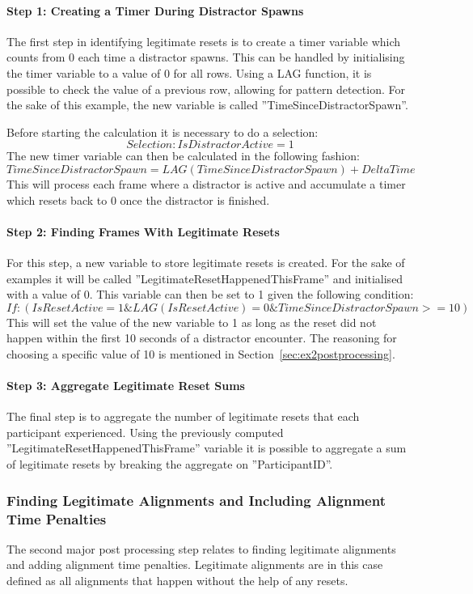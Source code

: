 \paragraph{Step 1: Creating a Timer During Distractor Spawns}
The first step in identifying legitimate resets is to create a timer variable which counts from 0 each time a distractor spawns. This can be handled by initialising the timer variable to a value of 0 for all rows. Using a LAG function, it is possible to check the value of a previous row, allowing for pattern detection. For the sake of this example, the new variable is called ''TimeSinceDistractorSpawn''. 

Before starting the calculation it is necessary to do a selection:
$$
Selection: IsDistractorActive = 1
$$
The new timer variable can then be calculated in the following fashion:
$$
TimeSinceDistractorSpawn = LAG(TimeSinceDistractorSpawn) + DeltaTime
$$
This will process each frame where a distractor is active and accumulate a timer which resets back to 0 once the distractor is finished. 

\paragraph{Step 2: Finding Frames With Legitimate Resets}
For this step, a new variable to store legitimate resets is created. For the sake of examples it will be called ''LegitimateResetHappenedThisFrame'' and initialised with a value of 0. This variable can then be set to 1 given the following condition:
$$
If: (IsResetActive = 1 \& LAG(IsResetActive) = 0 \& TimeSinceDistractorSpawn >= 10)
$$
This will set the value of the new variable to 1 as long as the reset did not happen within the first 10 seconds of a distractor encounter. The reasoning for choosing a specific value of 10 is mentioned in Section~\ref{sec:ex2postprocessing}.

\paragraph{Step 3: Aggregate Legitimate Reset Sums}
The final step is to aggregate the number of legitimate resets that each participant experienced. Using the previously computed ''LegitimateResetHappenedThisFrame'' variable it is possible to aggregate a sum of legitimate resets by breaking the aggregate on ''ParticipantID''. 

\subsubsection{Finding Legitimate Alignments and Including Alignment Time Penalties}
The second major post processing step relates to finding legitimate alignments and adding alignment time penalties. Legitimate alignments are in this case defined as all alignments that happen without the help of any resets.  

